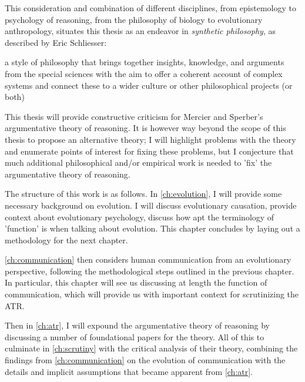 This consideration and combination of different disciplines, from epistemology to psychology of reasoning, from the philosophy of biology to evolutionary anthropology,
situates this thesis as an endeavor in \emph{synthetic philosophy}, as described by Eric Schliesser:
\begin{quoting}
    a style of philosophy that brings together insights, knowledge, and arguments from the special sciences with the aim to offer a coherent account of complex systems and connect these to a wider culture or other philosophical projects (or both) 
    \hfill \citep[pp.~1--2]{Schliesser19}
\end{quoting}

This thesis will provide constructive criticism for Mercier and Sperber's argumentative theory of reasoning. It is however way beyond the scope of this thesis to propose an alternative theory; I will highlight problems with the theory and enumerate points of interest for fixing these problems, but I conjecture that much additional philosophical and/or empirical work is needed to 'fix' the argumentative theory of reasoning.


The structure of this work is as follows.
In \cref{ch:evolution}, I will provide some necessary background on evolution. I will discuss evolutionary causation, provide context about evolutionary psychology, discuss how apt the terminology of 'function' is when talking about evolution. This chapter concludes by laying out a methodology for the next chapter.

\cref{ch:communication} then considers human communication from an evolutionary perspective, following the methodological steps outlined in the previous chapter. In particular, this chapter will see us discussing at length the function of communication, which will provide us with important context for scrutinizing the ATR.

Then in \cref{ch:atr}, I will expound the argumentative theory of reasoning by discussing a number of foundational papers for the theory.
All of this to culminate in \cref{ch:scrutiny} with the critical analysis of their theory, combining the findings from \cref{ch:communication} on the evolution of communication with the details and implicit assumptions that became apparent from \cref{ch:atr}.
